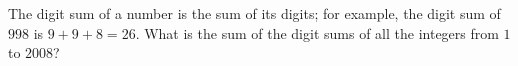 The digit sum of a number is the sum of its digits; for example, the digit sum of $998$ is $9+9+8=26$. What is the sum of the digit sums of all the integers from $1$ to $2008$?
